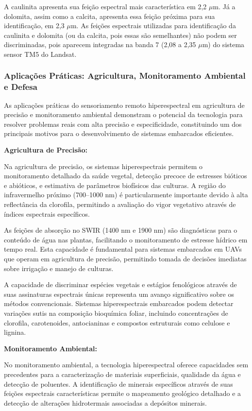 A caulinita apresenta sua feição espectral mais característica em 2,2 $\mu$m. 
Já a dolomita, assim como a calcita, apresenta essa feição próxima para sua 
identificação, em 2,3 $\mu$m. As feições espectrais utilizadas para 
identificação da caulinita e dolomita (ou da calcita, pois essas são 
semelhantes) não podem ser discriminadas, pois aparecem integradas na banda 
7 (2,08 a 2,35 $\mu$m) do sistema sensor TM5 do Landsat.

\subsubsection{Aplicações Práticas: Agricultura, Monitoramento 
Ambiental e Defesa}

As aplicações práticas do sensoriamento remoto hiperespectral em agricultura 
de precisão e monitoramento ambiental demonstram o potencial da tecnologia 
para resolver problemas reais com alta precisão e especificidade, 
constituindo um dos principais motivos para o desenvolvimento de sistemas 
embarcados eficientes.

\textbf{Agricultura de Precisão:}

Na agricultura de precisão, os sistemas hiperespectrais permitem o 
monitoramento detalhado da saúde vegetal, detecção precoce de estresses 
bióticos e abióticos, e estimativa de parâmetros biofísicos das culturas. 
A região do infravermelho próximo (700--1000 nm) é particularmente importante 
devido à alta reflectância da clorofila, permitindo a avaliação do vigor 
vegetativo através de índices espectrais específicos.

As feições de absorção no SWIR (1400 nm e 1900 nm) são diagnósticas para o 
conteúdo de água nas plantas, facilitando o monitoramento de estresse hídrico 
em tempo real. Esta capacidade é fundamental para sistemas embarcados em 
UAVs que operam em agricultura de precisão, permitindo tomada de decisões 
imediatas sobre irrigação e manejo de culturas.

A capacidade de discriminar espécies vegetais e estágios fenológicos através 
de suas assinaturas espectrais únicas representa um avanço significativo 
sobre os métodos convencionais. Sistemas hiperespectrais embarcados podem 
detectar variações sutis na composição bioquímica foliar, incluindo 
concentrações de clorofila, carotenoides, antocianinas e compostos 
estruturais como celulose e lignina.

\textbf{Monitoramento Ambiental:}

No monitoramento ambiental, a tecnologia hiperespectral oferece capacidades 
sem precedentes para a caracterização de materiais superficiais, qualidade 
da água e detecção de poluentes. A identificação de minerais específicos 
através de suas feições espectrais características permite o mapeamento 
geológico detalhado e a detecção de alterações hidrotermais associadas a 
depósitos minerais.

